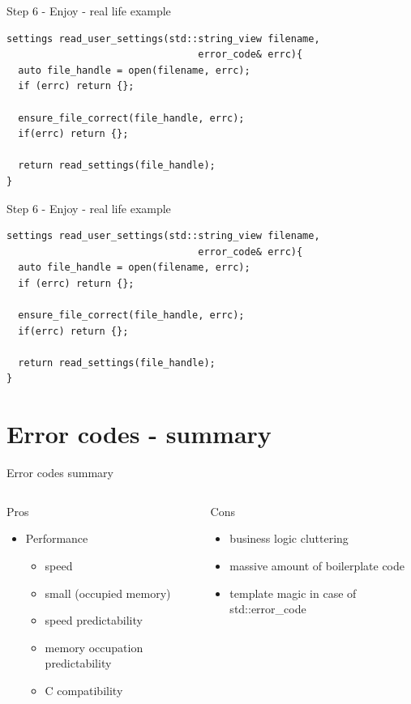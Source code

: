 \documentclass[10pt]{beamer}
\begin{document}
\begin{frame}[fragile]{Step 6 - Enjoy - real life example}
	\begin{verbatim}
settings read_user_settings(std::string_view filename,
	                             error_code& errc){
  auto file_handle = open(filename, errc);
  if (errc) return {};

  ensure_file_correct(file_handle, errc);
  if(errc) return {};

  return read_settings(file_handle);
}
	\end{verbatim}
\end{frame}

\begin{frame}[fragile]{Step 6 - Enjoy - real life example}
	\begin{verbatim}
settings read_user_settings(std::string_view filename,
	                             error_code& errc){
  auto file_handle = open(filename, errc);
  if (errc) return {};

  ensure_file_correct(file_handle, errc);
  if(errc) return {};

  return read_settings(file_handle);
}
	\end{verbatim}
\end{frame}

	
\section{Error codes - summary}

\begin{frame}{Error codes summary}
	\begin{columns}[T]
		\begin{column}{0.48\linewidth}
			Pros 
			\vfill
			\begin{itemize}
				\item Performance
				\begin{itemize}[<+- | alert@+>]
					\item speed
					\item small (occupied memory)
					\item speed predictability
					\item memory occupation predictability
					\item C compatibility
				\end{itemize} \pause
			\end{itemize}
		\end{column}
		\begin{column}{0.48\linewidth}
			Cons
			\vfill
			\begin{itemize}[<+- | alert@+>]
				\item business logic cluttering
				\item massive amount of boilerplate code
				\item template magic in case of std::error\_code
			\end{itemize}
		\end{column}
	\end{columns}
\end{frame}
\end{document}
